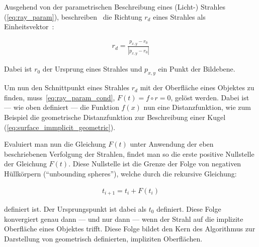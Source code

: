 Ausgehend von der parametrischen Beschreibung eines (Licht-) Strahles
(\autoref{eq:ray_param}), beschreiben~\citeauthor{hart_ray_1989} die
Richtung $r_{d}$ eines Strahles als Einheitsvektor~\parencite[S.
291]{hart_ray_1989}:

\begin{gather}
    r_{d} = \frac{p_{x, y} - r_{0}}{|p_{x, y} - r_{0}|}
\end{gather}

Dabei ist $r_{0}$ der Ursprung eines Strahles und $p_{x, y}$ ein Punkt
der Bildebene.

Um nun den Schnittpunkt eines Strahles $r_{d}$ mit der Oberfläche eines
Objektes zu finden, muss~\autoref{eq:ray_param_cond}, $F(t) = f \circ
r = 0$, gelöst werden. Dabei ist --- wie oben definiert --- die Funktion
$f(x)$ nun eine Distanzfunktion, wie zum Beispiel die geometrische
Distanzfunktion zur Beschreibung einer Kugel
(\autoref{eq:surface_immplicit_geometric}).

Evaluiert man nun die Gleichung $F(t)$ unter Anwendung der eben beschriebenen
Verfolgung der Strahlen, findet man so die erste positive Nullstelle der Gleichung
$F(t)$. Diese Nullstelle ist die Grenze der Folge von negativen Hüllkörpern
(``unbounding spheres''), welche durch die rekursive Gleichung:

\begin{gather}
    t_{i+1} = t_{i} + F(t_{i})
\end{gather}

definiert ist. Der Ursprungspunkt ist dabei als $t_{0}$ definiert. Diese Folge
konvergiert genau dann --- und nur dann --- wenn der Strahl auf die implizite
Oberfläche eines Objektes trifft. Diese Folge bildet den Kern des Algorithmus
zur Darstellung von geometrisch definierten, impliziten Oberflächen.

